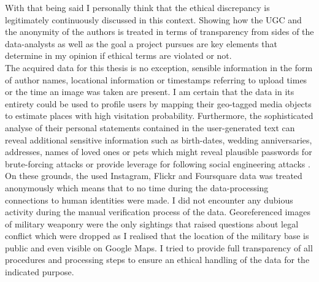 With that being said I personally think that the ethical discrepancy is legitimately continuously discussed in this context. Showing how the UGC and the anonymity of the authors is treated in terms of transparency from sides of the data-analysts as well as the goal a project pursues are key elements that determine in my opinion if ethical terms are violated or not. \\

The acquired data for this thesis is no exception, sensible information in the form of author names, locational information or timestamps referring to upload times or the time an image was taken are present. I am certain that the data in its entirety could be used to profile users by mapping their geo-tagged media objects to estimate places with high visitation probability. Furthermore, the sophisticated analyse of their personal statements contained in the user-generated text can reveal additional sensitive information such as birth-dates, wedding anniversaries, addresses, names of loved ones or pets which might reveal plausible passwords for brute-forcing attacks \parencite{Routh2018} or provide leverage for following social engineering attacks \parencite{Krombholz2015}. On these grounds, the used Instagram, Flickr and Foursquare data was treated anonymously which means that to no time during the data-processing connections to human identities were made. I did not encounter any dubious activity during the manual verification process of the data. Georeferenced images of military weaponry were the only sightings that raised questions about legal conflict which were dropped as I realised that the location of the military base is public and even visible on Google Maps. I tried to provide full transparency of all procedures and processing steps to ensure an ethical handling of the data for the indicated purpose.